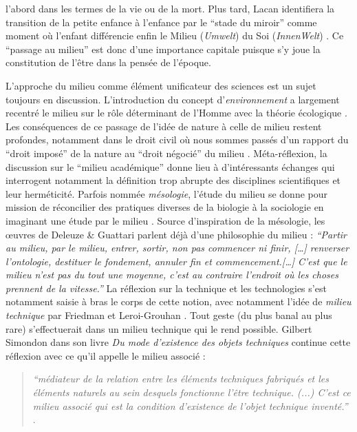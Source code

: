 l’abord dans les termes de la vie ou de la mort. Plus tard, Lacan identifiera la transition de la petite enfance à l’enfance par le ``stade du miroir'' comme moment où l’enfant différencie enfin le Milieu (\textit{Umwelt}) du Soi (\textit{InnenWelt}) \citep{Lacan2001}. Ce ``passage au milieu'' est donc d’une importance capitale puisque s’y joue la constitution de l’être dans la pensée de l'époque.

L’approche du milieu comme élément unificateur des sciences est un sujet toujours en discussion. L’introduction du concept d’\textit{environnement} a largement recentré le milieu sur le rôle déterminant de l’Homme avec  la théorie écologique \citep{Gandolfo2008}. Les conséquences de ce passage de l’idée de nature à celle de milieu restent profondes, notamment dans le droit civil où nous sommes passés d’un rapport du ``droit imposé'' de la nature au ``droit négocié'' du milieu \citep{Papaux2008}. Méta-réflexion, la discussion sur le ``milieu académique'' donne lieu à d’intéressants échanges \citep{Stengers2009} qui interrogent notamment la définition trop abrupte des disciplines scientifiques et leur herméticité. Parfois nommée \textit{mésologie}, l’étude du milieu se donne pour mission de réconcilier des pratiques diverses de la biologie à la sociologie en imaginant une étude par le milieu \citep{Stengers2003}. Source d'inspiration de la mésologie, les œuvres de Deleuze \& Guattari parlent déjà d’une philosophie du milieu : \textit{``Partir au milieu, par le milieu, entrer, sortir, non pas commencer ni finir, […] renverser l'ontologie, destituer le fondement, annuler fin et commencement.[…] C'est que le milieu n'est pas du tout une moyenne, c'est au contraire l'endroit où les choses prennent de la vitesse.''} \citep{Deleuze1972} 
La réflexion sur la technique et les technologies s’est notamment saisie à bras le corps de cette notion, avec notamment l’idée de \textit{milieu technique} par Friedman et Leroi-Grouhan \citep{Stiegler1998}. Tout geste (du plus banal au plus rare) s’effectuerait dans un milieu technique qui le rend possible. Gilbert Simondon dans son livre \textit{Du mode d’existence des objets techniques} continue cette réflexion avec ce qu’il appelle le milieu associé : 

\begin{quote}
    \textit{``médiateur de la relation entre les éléments techniques fabriqués et les éléments  naturels au sein desquels fonctionne l’être technique. (...) C’est ce milieu associé    qui est la condition d’existence de l’objet technique inventé.''} \citep{Simondon1989}. 
\end{quote}

